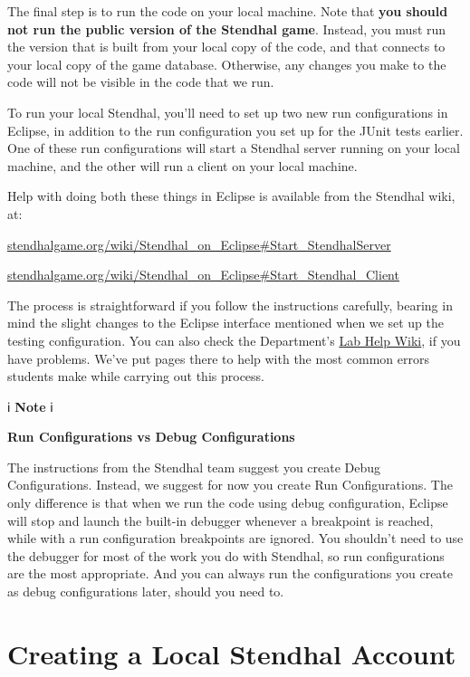 \documentclass[
]{book}
\begin{document}
The final step is to run the code on your local machine. Note that \textbf{you should not run the public version of the Stendhal game}. Instead, you must run the version that is built from your local copy of the code, and that connects to your local copy of the game database. Otherwise, any changes you make to the code will not be visible in the code that we run.

To run your local Stendhal, you'll need to set up two new run configurations in Eclipse, in addition to the run configuration you set up for the JUnit tests earlier. One of these run configurations will start a Stendhal server running on your local machine, and the other will run a client on your local machine.

Help with doing both these things in Eclipse is available from the Stendhal wiki, at:

\href{https://stendhalgame.org/wiki/Stendhal_on_Eclipse\#Start_StendhalServer}{stendhalgame.org/wiki/Stendhal\_on\_Eclipse\#Start\_StendhalServer}

\href{https://stendhalgame.org/wiki/Stendhal_on_Eclipse\#Start_Stendhal_Client}{stendhalgame.org/wiki/Stendhal\_on\_Eclipse\#Start\_Stendhal\_Client}

The process is straightforward if you follow the instructions carefully, bearing in mind the slight changes to the Eclipse interface mentioned when we set up the testing configuration. You can also check the Department's \href{https://wiki.cs.manchester.ac.uk/index.php/LabHelp:Errors}{Lab Help Wiki}, if you have problems. We've put pages there to help with the most common errors students make while carrying out this process.

ℹ️ \textbf{Note} ℹ️

\textbf{Run Configurations vs Debug Configurations}

The instructions from the Stendhal team suggest you create Debug Configurations. Instead, we suggest for now you create Run Configurations. The only difference is that when we run the code using debug configuration, Eclipse will stop and launch the built-in debugger whenever a breakpoint is reached, while with a run configuration breakpoints are ignored. You shouldn't need to use the debugger for most of the work you do with Stendhal, so run configurations are the most appropriate. And you can always run the configurations you create as debug configurations later, should you need to.

\hypertarget{saccount}{%
\section{Creating a Local Stendhal Account}\label{saccount}}
\end{document}
